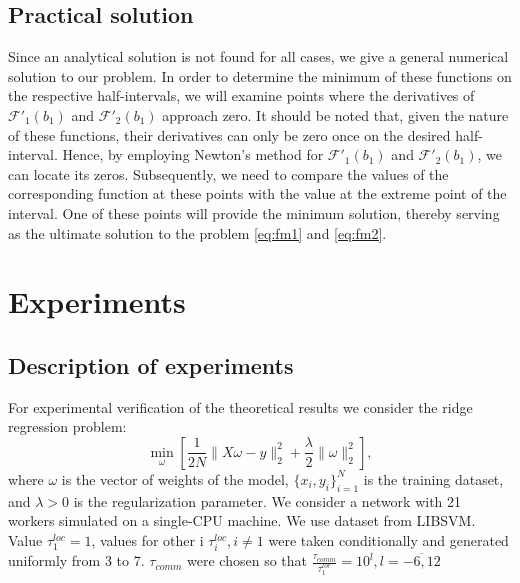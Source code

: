 \documentclass{article}
\begin{document}
\subsection{Practical solution}\label{eq:3.5}
Since an analytical solution is not found for all cases, we give a general numerical solution to our problem. In order to determine the minimum of these functions on the respective half-intervals, we will examine points where the derivatives of $\mathcal{F'}_1(b_1)$ and $\mathcal{F'}_2(b_1)$ approach zero. It should be noted that, given the nature of these functions, their derivatives can only be zero once on the desired half-interval. Hence, by employing Newton's method \cite{polyak2007newton} for $\mathcal{F'}_1(b_1)$ and $\mathcal{F'}_2(b_1)$, we can locate its zeros. Subsequently, we need to compare the values of the corresponding function at these points with the value at the extreme point of the interval. One of these points will provide the minimum solution, thereby serving as the ultimate solution to the problem \eqref{eq:fm1} and \eqref{eq:fm2}.

\section{Experiments}

\subsection{Description of experiments}
For experimental verification of the theoretical results we consider the ridge regression problem: 
\begin{equation}
    \label{ridge}
    \underset{\omega}{\min}[ \frac{1}{2N} \|X\omega - y\|_2^2 + \frac{\lambda}{2}\|\omega\|_2^2],
\end{equation}
where $\omega$ is the vector of weights of the model, $\{x_i, y_i\}_{i = 1}^N$ is the training dataset, and $\lambda > 0$ is the regularization parameter. We consider a network  with 21 workers simulated on a single-CPU machine. We use dataset from LIBSVM. Value $\tau_1^{loc} = 1$, values for other i $\tau_i^{loc}, i \neq 1$ were taken conditionally and generated uniformly from 3 to 7. $\tau_{comm}$ were chosen so that $\frac{\tau _{comm}}{\tau _1^{loc}} = 10^l, l = \overline{-6, 12}$
\end{document}
